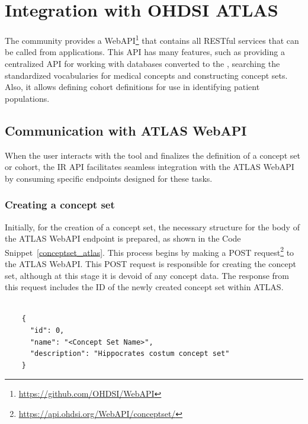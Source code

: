 \section{Integration with OHDSI ATLAS}

The {\ohdsi} community provides a WebAPI\footnote{\url{https://github.com/OHDSI/WebAPI}} that contains all {\ohdsi} RESTful services that can be called from {\ohdsi} applications. This API has many features, such as providing a centralized API for working with databases converted to the {\omop}, searching the {\omop} standardized vocabularies for medical concepts and constructing concept sets. Also, it allows defining cohort definitions for use in identifying patient populations.


\subsection{Communication with ATLAS WebAPI}

When the user interacts with the tool and finalizes the definition of a concept set or cohort, the IR API facilitates seamless integration with the ATLAS WebAPI by consuming specific endpoints designed for these tasks.

\subsubsection{Creating a concept set}

Initially, for the creation of a concept set, the necessary structure for the body of the ATLAS WebAPI endpoint is prepared, as shown in the Code Snippet~\ref{conceptset_atlas}. This process begins by making a POST request\footnote{\url{https://api.ohdsi.org/WebAPI/conceptset/}} to the ATLAS WebAPI. This POST request is responsible for creating the concept set, although at this stage it is devoid of any concept data. The response from this request includes the ID of the newly created concept set within ATLAS.

\begin{listing}[H]
  \begin{verbatim}
      
    { 
      "id": 0, 
      "name": "<Concept Set Name>", 
      "description": "Hippocrates costum concept set"
    }

  \end{verbatim}
  \caption[The body to create the concept set in ATLAS]{The body to create the concept set in ATLAS.}
  \label{conceptset_atlas}
\end{listing}


